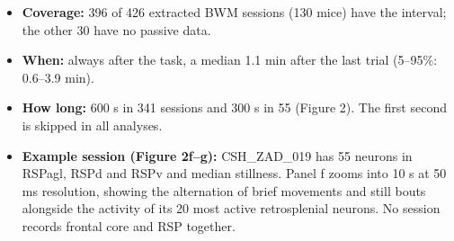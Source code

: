 \documentclass[10pt,a4paper]{article}
\begin{document}
\begin{itemize}
\item \textbf{Coverage:} 396 of 426 extracted BWM sessions (130 mice) have the interval; the other 30 have no passive data.
\item \textbf{When:} always after the task, a median 1.1 min after the last trial (5--95\%: 0.6--3.9 min).
\item \textbf{How long:} 600 s in 341 sessions and 300 s in 55 (Figure 2). The first second is skipped in all analyses.
\item \textbf{Example session (Figure 2f--g):} CSH\_ZAD\_019 has 55 neurons in RSPagl, RSPd and RSPv and median stillness. Panel f zooms into 10 s at 50 ms resolution, showing the alternation of brief movements and still bouts alongside the activity of its 20 most active retrosplenial neurons. No session records frontal core and RSP together.
\end{itemize}
\end{document}
